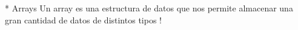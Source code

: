* Arrays Un array es una estructura de datos que 
nos permite almacenar una gran cantidad de datos de distintos tipos !